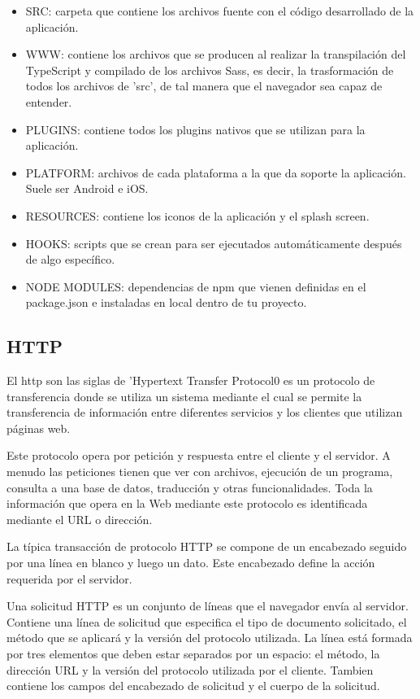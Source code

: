 \documentclass[a4paper, 12pt]{book}
\begin{document}
\begin{itemize}
  \item SRC: carpeta que contiene los archivos fuente con el c\'odigo desarrollado de la aplicaci\'on.
 \item WWW: contiene los archivos que se producen al realizar la transpilaci\'on del TypeScript y compilado de los archivos Sass, es decir, la trasformaci\'on de todos los archivos de 'src', de tal manera que el navegador sea capaz de entender.
 \item PLUGINS: contiene todos los plugins nativos que se utilizan para la aplicaci\'on.
 \item PLATFORM: archivos de cada plataforma a la que da soporte la aplicaci\'on. Suele ser Android e iOS.
 \item RESOURCES: contiene los iconos de la aplicaci\'on y el splash screen.
 \item HOOKS: scripts que se crean para ser ejecutados autom\'aticamente despu\'es de algo espec\'ifico.
\item NODE MODULES: dependencias de npm que vienen definidas en el package.json e instaladas en local dentro de tu proyecto.

\end{itemize}

\subsection{HTTP}
\label{subsec:estilo}

El http son las siglas de 'Hypertext Transfer Protocol0 es un protocolo de transferencia donde se utiliza un sistema mediante el cual se permite la transferencia de informaci\'on entre diferentes servicios y los clientes que utilizan p\'aginas web.

Este protocolo opera por petici\'on y respuesta entre el cliente y el servidor. A menudo las peticiones tienen que ver con archivos, ejecuci\'on de un programa, consulta a una base de datos, traducci\'on y otras funcionalidades. Toda la informaci\'on que opera en la Web mediante este protocolo es identificada mediante el URL o direcci\'on.

La t\'ipica transacci\'on de protocolo HTTP se compone de un encabezado seguido por una l\'inea en blanco y luego un dato. Este encabezado define la acci\'on requerida por el servidor.

Una solicitud HTTP es un conjunto de l\'ineas que el navegador env\'ia al servidor. Contiene una l\'inea de solicitud que especifica el tipo de documento solicitado, el m\'etodo que se aplicar\'a y la versi\'on del protocolo utilizada. La l\'inea est\'a formada por tres elementos que deben estar separados por un espacio: el m\'etodo, la direcci\'on URL y la versi\'on del protocolo utilizada por el cliente. Tambien contiene los campos del encabezado de solicitud y el cuerpo de la solicitud.
\end{document}
